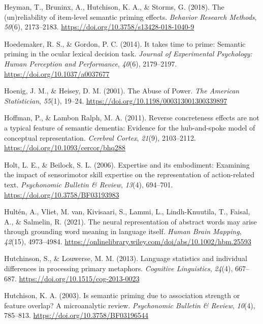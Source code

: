 \documentclass[
  12pt,
  man,floatsintext]{apa7}
\newlength{\cslhangindent}
\newlength{\cslentryspacingunit} %
\newenvironment{CSLReferences}[2] %
 {%
  \setlength{\parindent}{0pt}
  \ifodd #1
  \let\oldpar\par
  \def\par{\hangindent=\cslhangindent\oldpar}
  \fi
  \setlength{\parskip}{#2\cslentryspacingunit}
 }%
 {}
\begin{document}
\begin{CSLReferences}{1}{0}
\leavevmode{}%
Heyman, T., Bruninx, A., Hutchison, K. A., \& Storms, G. (2018). The (un)reliability of item-level semantic priming effects. \emph{Behavior Research Methods}, \emph{50}(6), 2173--2183. \url{https://doi.org/10.3758/s13428-018-1040-9}

\leavevmode{}%
Hoedemaker, R. S., \& Gordon, P. C. (2014). It takes time to prime: {Semantic} priming in the ocular lexical decision task. \emph{Journal of Experimental Psychology: Human Perception and Performance}, \emph{40}(6), 2179--2197. \url{https://doi.org/10.1037/a0037677}

\leavevmode{}%
Hoenig, J. M., \& Heisey, D. M. (2001). The {Abuse} of {Power}. \emph{The American Statistician}, \emph{55}(1), 19--24. \url{https://doi.org/10.1198/000313001300339897}

\leavevmode{}%
Hoffman, P., \& Lambon Ralph, M. A. (2011). Reverse concreteness effects are not a typical feature of semantic dementia: {Evidence} for the hub-and-spoke model of conceptual representation. \emph{Cerebral Cortex}, \emph{21}(9), 2103--2112. \url{https://doi.org/10.1093/cercor/bhq288}

\leavevmode{}%
Holt, L. E., \& Beilock, S. L. (2006). Expertise and its embodiment: {Examining} the impact of sensorimotor skill expertise on the representation of action-related text. \emph{Psychonomic Bulletin \& Review}, \emph{13}(4), 694--701. \url{https://doi.org/10.3758/BF03193983}

\leavevmode{}%
Hultén, A., Vliet, M. van, Kivisaari, S., Lammi, L., Lindh-Knuutila, T., Faisal, A., \& Salmelin, R. (2021). The neural representation of abstract words may arise through grounding word meaning in language itself. \emph{Human Brain Mapping}, \emph{42}(15), 4973--4984. \url{https://onlinelibrary.wiley.com/doi/abs/10.1002/hbm.25593}

\leavevmode{}%
Hutchinson, S., \& Louwerse, M. M. (2013). Language statistics and individual differences in processing primary metaphors. \emph{Cognitive Linguistics}, \emph{24}(4), 667--687. \url{https://doi.org/10.1515/cog-2013-0023}

\leavevmode{}%
Hutchison, K. A. (2003). Is semantic priming due to association strength or feature overlap? {A} microanalytic review. \emph{Psychonomic Bulletin \& Review}, \emph{10}(4), 785--813. \url{https://doi.org/10.3758/BF03196544}


\end{CSLReferences}
\end{document}
